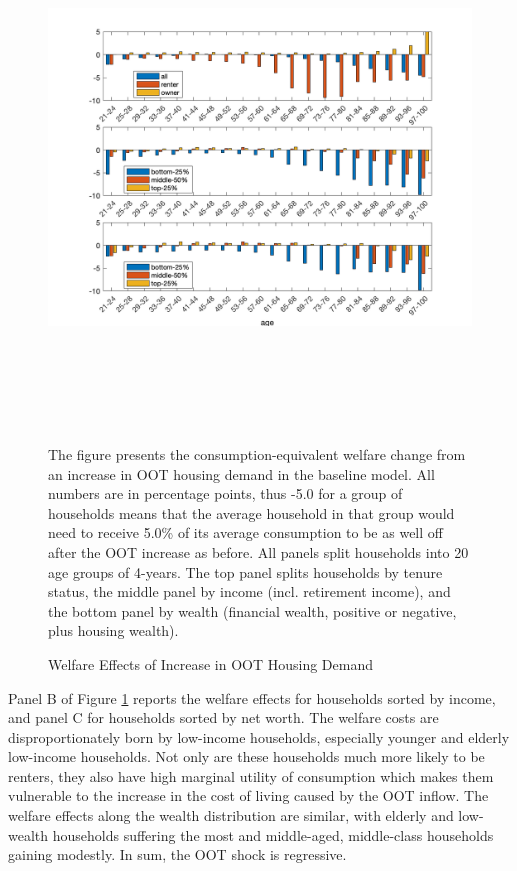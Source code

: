 \documentclass[letterpaper,12pt,dvipsnames,usenames]{article}
\theoremstyle{definition}
\begin{document}
\begin{spacing}{1.25}
{\begin{figure}[h!]
\begin{center}
\caption{Welfare Effects of Increase in OOT Housing Demand}\label{fig:welfarebins}
\includegraphics[width=7in,height=5.4in]{../Figures/welfarebyageincomewealth_updated}
\end{center}
\begin{minipage}{\textwidth}\tiny
    The figure presents the consumption-equivalent welfare change from an increase in OOT housing demand in the baseline model. All numbers are in percentage points, thus -5.0 for a group of households means that the average household in that group would need to receive 5.0\% of its average consumption to be as well off after the OOT increase as before. All panels split households into 20 age groups of 4-years. The top panel splits households by tenure status, the middle panel by income (incl. retirement income), and the bottom panel by wealth (financial wealth, positive or negative, plus housing wealth).
    \end{minipage}
\end{figure}


Panel B of Figure \ref{fig:welfarebins} reports the welfare effects for households sorted by income, and panel C for households sorted by net worth. The welfare costs are disproportionately born by low-income households, especially younger and elderly low-income households. Not only are these households much more likely to be renters, they also have high marginal utility of consumption which makes them vulnerable to the increase in the cost of living caused by the OOT inflow. The welfare effects along the wealth distribution are similar, with elderly and low-wealth households suffering the most and middle-aged, middle-class households gaining modestly. In sum, the OOT shock is regressive.

}
\end{spacing}
\end{document}
